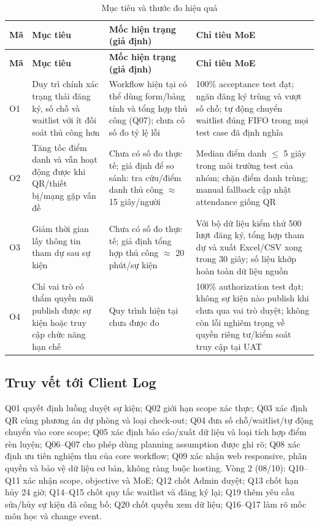 \begingroup\tblsetup\tblzebra
\begin{longtable}{L{0.9cm}L{3.8cm}L{4.0cm}L{5.3cm}}
\caption{Mục tiêu và thước đo hiệu quả}\label{tab:objectives}\\
\toprule
{}\textbf{Mã} & \textbf{Mục tiêu} & \textbf{Mốc hiện trạng (giả định)} & \textbf{Chỉ tiêu MoE} \\
\midrule
\endfirsthead
\toprule
{}\textbf{Mã} & \textbf{Mục tiêu} & \textbf{Mốc hiện trạng (giả định)} & \textbf{Chỉ tiêu MoE} \\
\midrule
\endhead
\bottomrule
\endlastfoot
O1 & Duy trì chính xác trạng thái đăng ký, số chỗ và waitlist với ít đối soát thủ công hơn & Workflow hiện tại có thể dùng form/bảng tính và tổng hợp thủ công (Q07); chưa có số đo tỷ lệ lỗi & 100\% acceptance test đạt; ngăn đăng ký trùng và vượt số chỗ; tự động chuyển waitlist đúng FIFO trong mọi test case đã định nghĩa \\
O2 & Tăng tốc điểm danh và vẫn hoạt động được khi QR/thiết bị/mạng gặp vấn đề & Chưa có số đo thực tế; giả định để so sánh: tra cứu/điểm danh thủ công $\approx$ 15 giây/người & Median điểm danh $\leq$ 5 giây trong môi trường test của nhóm; chặn điểm danh trùng; manual fallback cập nhật attendance giống QR \\
O3 & Giảm thời gian lấy thông tin tham dự sau sự kiện & Chưa có số đo thực tế; giả định tổng hợp thủ công $\approx$ 20 phút/sự kiện & Với bộ dữ liệu kiểm thử 500 lượt đăng ký, tổng hợp tham dự và xuất Excel/CSV xong trong 30 giây; số liệu khớp hoàn toàn dữ liệu nguồn \\
O4 & Chỉ vai trò có thẩm quyền mới publish được sự kiện hoặc truy cập chức năng hạn chế & Quy trình hiện tại chưa được đo & 100\% authorization test đạt; không sự kiện nào publish khi chưa qua vai trò duyệt; không còn lỗi nghiêm trọng về quyền riêng tư/kiểm soát truy cập tại UAT \\
\end{longtable}
\endgroup

\subsection*{Truy vết tới Client Log}
Q01 quyết định luồng duyệt sự kiện; Q02 giới hạn scope xác thực; Q03 xác định QR cùng phương án dự phòng và loại check-out; Q04 đưa số chỗ/waitlist/tự động chuyển vào core scope; Q05 xác định báo cáo/xuất dữ liệu và loại tích hợp điểm rèn luyện; Q06--Q07 cho phép dùng planning assumption được ghi rõ; Q08 xác định ưu tiên nghiệm thu của core workflow; Q09 xác nhận web responsive, phân quyền và bảo vệ dữ liệu cơ bản, không ràng buộc hosting. Vòng 2 (08/10): Q10--Q11 xác nhận scope, objective và MoE; Q12 chốt Admin duyệt; Q13 chốt hạn hủy 24 giờ; Q14--Q15 chốt quy tắc waitlist và đăng ký lại; Q19 thêm yêu cầu sửa/hủy sự kiện đã công bố; Q20 chốt quyền xem dữ liệu; Q16--Q17 làm rõ mốc môn học và change event.

